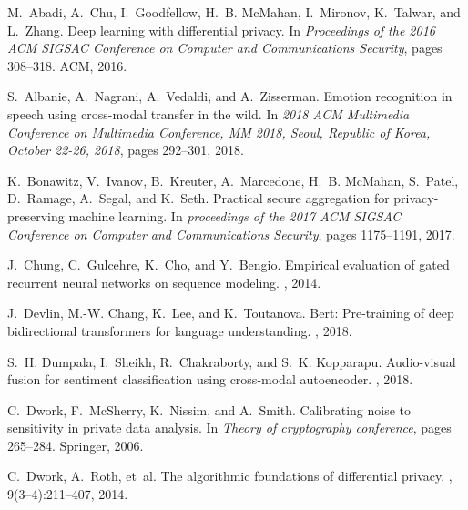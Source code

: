 \documentclass[11pt]{article}
\begin{document}
%
%

\begin{thebibliography}{10}

M.~Abadi, A.~Chu, I.~Goodfellow, H.~B. McMahan, I.~Mironov, K.~Talwar, and
  L.~Zhang.
\newblock Deep learning with differential privacy.
\newblock In {\em Proceedings of the 2016 ACM SIGSAC Conference on Computer and
  Communications Security}, pages 308--318. ACM, 2016.

S.~Albanie, A.~Nagrani, A.~Vedaldi, and A.~Zisserman.
\newblock Emotion recognition in speech using cross-modal transfer in the wild.
\newblock In {\em 2018 {ACM} Multimedia Conference on Multimedia Conference,
  {MM} 2018, Seoul, Republic of Korea, October 22-26, 2018}, pages 292--301,
  2018.

K.~Bonawitz, V.~Ivanov, B.~Kreuter, A.~Marcedone, H.~B. McMahan, S.~Patel,
  D.~Ramage, A.~Segal, and K.~Seth.
\newblock Practical secure aggregation for privacy-preserving machine learning.
\newblock In {\em proceedings of the 2017 ACM SIGSAC Conference on Computer and
  Communications Security}, pages 1175--1191, 2017.

J.~Chung, C.~Gulcehre, K.~Cho, and Y.~Bengio.
\newblock Empirical evaluation of gated recurrent neural networks on sequence
  modeling.
, 2014.

J.~Devlin, M.-W. Chang, K.~Lee, and K.~Toutanova.
\newblock Bert: Pre-training of deep bidirectional transformers for language
  understanding.
, 2018.

S.~H. Dumpala, I.~Sheikh, R.~Chakraborty, and S.~K. Kopparapu.
\newblock Audio-visual fusion for sentiment classification using cross-modal
  autoencoder.
, 2018.

C.~Dwork, F.~McSherry, K.~Nissim, and A.~Smith.
\newblock Calibrating noise to sensitivity in private data analysis.
\newblock In {\em Theory of cryptography conference}, pages 265--284. Springer,
  2006.

C.~Dwork, A.~Roth, et~al.
\newblock The algorithmic foundations of differential privacy.
, 9(3--4):211--407, 2014.


\end{thebibliography}
\end{document}
